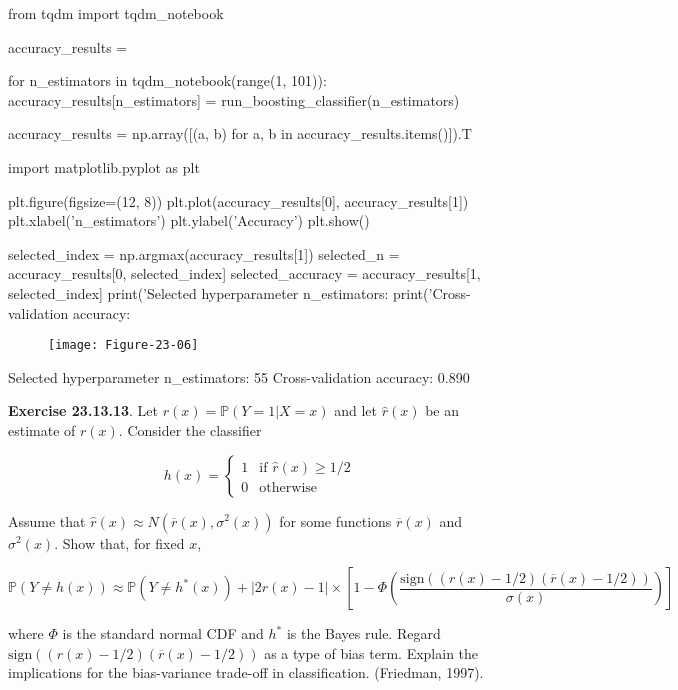 \begin{python}
from tqdm import tqdm_notebook

accuracy_results = {}

for n_estimators in tqdm_notebook(range(1, 101)):
    accuracy_results[n_estimators] = run_boosting_classifier(n_estimators)
    
accuracy_results = np.array([(a, b) for a, b in accuracy_results.items()]).T
\end{python}

\begin{python}
import matplotlib.pyplot as plt

plt.figure(figsize=(12, 8))
plt.plot(accuracy_results[0], accuracy_results[1])
plt.xlabel('n_estimators')
plt.ylabel('Accuracy')
plt.show()

selected_index = np.argmax(accuracy_results[1])
selected_n = accuracy_results[0, selected_index]
selected_accuracy = accuracy_results[1, selected_index]
print('Selected hyperparameter n_estimators: %
print('Cross-validation accuracy: %
\end{python}

\begin{figure}[H]
\texttt{[image: Figure-23-06]}
\end{figure}

\begin{console}
Selected hyperparameter n\_estimators: 55
Cross-validation accuracy: 0.890
\end{console}

\textbf{Exercise 23.13.13}. Let \(r(x) = \mathbb{P}(Y = 1 | X = x)\) and
let \(\hat{r}(x)\) be an estimate of \(r(x)\). Consider the classifier

\[
h(x) = \begin{cases}
1 &\text{if } \hat{r}(x) \geq 1/2 \\
0 &\text{otherwise}
\end{cases}
\]

Assume that \(\hat{r}(x) \approx N(\overline{r}(x), \sigma^2(x))\) for
some functions \(\overline{r}(x)\) and \(\sigma^2(x)\). Show that, for
fixed \(x\),

\[ \mathbb{P}(Y \neq h(x)) \approx \mathbb{P}(Y \neq h^*(x)) + 
\left| 2 r(x) - 1 \right| \times \left[ 1 - \Phi \left( \frac{\text{sign} \left( (r(x) - 1/2) (\overline{r}(x) - 1/2) \right)}{\sigma(x)} \right) \right]\]

where \(\Phi\) is the standard normal CDF and \(h^*\) is the Bayes rule.
Regard
\(\text{sign} \left( (r(x) - 1/2) (\overline{r}(x) - 1/2) \right)\) as a
type of bias term. Explain the implications for the bias-variance
trade-off in classification. (Friedman, 1997).

